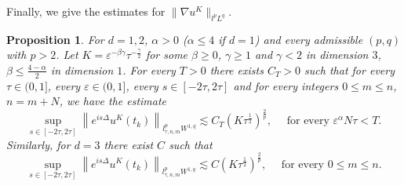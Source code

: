 \documentclass[10pt,a4paper]{article}
\newtheorem{proposition}[theorem]{Proposition}
\begin{document}

  
  Finally, we give the estimates for \(\|\nabla u^K\|_{l^p L^q}\).

  \begin{proposition}\label{DuKlpLq}
    For \(d =1,2\), \(\alpha>0\) (\(\alpha \leq 4\) if \(d=1\)) and every
    admissible \((p,q)\) with \(p>2\).
    Let \(K = \varepsilon^{-\beta\gamma}\tau^{-\frac\gamma2}\) for some
    \(\beta\geq0\), \(\gamma\geq1\) and \(\gamma<2\) in dimension \(3\), \(\beta
    \leq \frac{4-\alpha}2\) in dimension \(1\). 
    For every \(T>0\) there exists \(C_T>0\) such that 
    for every \( \tau \in (0,1] \), every \(\varepsilon \in (0,1]\), 
    every \(s \in [-2\tau,2\tau] \) and for every integers 
    \(0 \leq m \leq n \), \(n=m+N\), we have the estimate
    \begin{equation}
      \sup_{s\in[-2\tau,2\tau]} \left\|e^{is\Delta} u^K(t_k)\right\|_{l^p_{\tau,n,m}W^{1,q}}
       \lesssim C_T (K\tau^\frac12)^\frac2p, \quad \text{ for every }
       \varepsilon^\alpha N\tau < T.
    \end{equation}
    Similarly, for \(d=3\) there exist \(C\) such that 
    \begin{equation}
      \sup_{s\in[-2\tau,2\tau]} \left\|e^{is\Delta} u^K(t_k)\right\|_{l^p_{\tau,n,m}W^{1,q}}
       \lesssim C (K\tau^\frac12)^\frac2p, \quad \text{ for every } 0 \leq m
       \leq n.
    \end{equation}
  \end{proposition}
\end{document}
